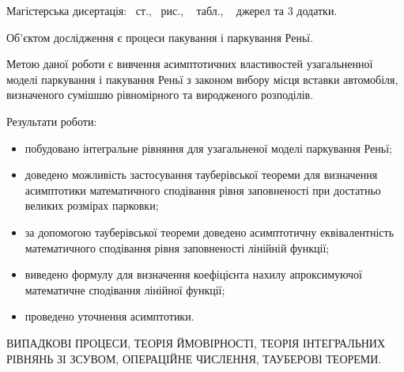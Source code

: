 

Магістерська дисертація: \pageref*{MyLastPage}~ст., \totfig~рис., \tottab~ табл., ~ джерел та 3 додатки.

Об'єктом дослідження є процеси пакування і паркування Реньї.

Метою даної роботи є вивчення асимптотичних властивостей узагальненної моделі паркування і пакування Реньї з законом вибору місця вставки автомобіля, визначеного сумішшю рівномірного та виродженого розподілів.

Результати роботи:
\begin{itemize}
	\item побудовано інтегральне рівняння для узагальненої моделі паркування Реньї;
	\item доведено можливість застосування тауберівської теореми для визначення асимптотики математичного сподівання рівня заповненості при достатньо великих розмірах парковки;
	\item за допомогою тауберівської теореми доведено асимптотичну еквівалентність математичного сподівання рівня заповненості лінійній функції;
	\item виведено формулу для визначення коефіцієнта нахилу апроксимуючої математичне сподівання лінійної функції;
	\item проведено уточнення асимптотики.
\end{itemize}

\MakeUppercase{випадкові процеси, теорія ймовірності, теорія інтегральних рівнянь зі зсувом, операційне числення, тауберові теореми.} 